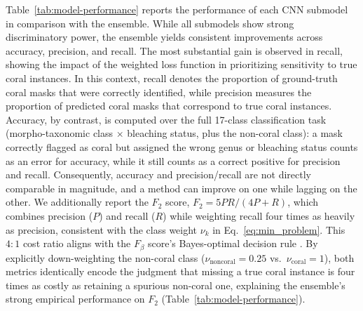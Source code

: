 \documentclass[11pt]{elsarticle}
\begin{document}
Table~\ref{tab:model-performance} reports the performance of each CNN submodel in comparison with the ensemble. While all submodels show strong discriminatory power, the ensemble yields consistent improvements across accuracy, precision, and recall. The most substantial gain is observed in recall, showing the impact of the weighted loss function in prioritizing sensitivity to true coral instances. In this context, recall denotes the proportion of ground-truth coral masks that were correctly identified, while precision measures the proportion of predicted coral masks that correspond to true coral instances. Accuracy, by contrast, is computed over the full 17-class classification task (morpho-taxonomic class $\times$ bleaching status, plus the non-coral class): a mask correctly flagged as coral but assigned the wrong genus or bleaching status counts as an error for accuracy, while it still counts as a correct positive for precision and recall. Consequently, accuracy and precision/recall are not directly comparable in magnitude, and a method can improve on one while lagging on the other. We additionally report the $F_2$ score, $F_2 = 5PR/(4P+R)$, which combines precision ($P$) and recall ($R$) while weighting recall four times as heavily as precision, consistent with the class weight $\nu_k$ in Eq.~\ref{eq:min_problem}. This $4{:}1$ cost ratio aligns with the $F_\beta$ score's Bayes-optimal decision rule \citep{lipton2014fbeta}. By explicitly down-weighting the non-coral class ($\nu_{\text{noncoral}} = 0.25$ vs.\ $\nu_{\text{coral}} = 1$), both metrics identically encode the judgment that missing a true coral instance is four times as costly as retaining a spurious non-coral one, explaining the ensemble's strong empirical performance on $F_2$ (Table~\ref{tab:model-performance}).
\end{document}
